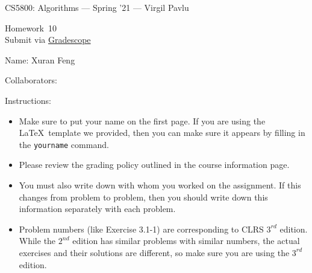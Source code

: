 \documentclass[11pt]{article}
\newcommand{\yourcollaborators}{}
\theoremstyle{definition}
\newcommand{\instructor}{Virgil Pavlu}
\newcommand{\hwnum}{10}
\theoremstyle{theorem}
\begin{document}
{\Large 
\begin{center}{CS5800: Algorithms} --- Spring '21 --- \instructor \end{center}}
{\large
\vspace{10pt}
\noindent Homework~\hwnum \vspace{2pt}\\
Submit via \href{https://www.gradescope.com/courses/232127}{Gradescope}}

\bigskip
{\large \noindent Name: Xuran Feng }

{\large \noindent Collaborators: \yourcollaborators}

\vspace{15pt}

{\large \noindent Instructions:}

\begin{itemize}

\item Make sure to put your name on the first page.  If you are using the \LaTeX~template we provided, then you can make sure it appears by filling in the \texttt{yourname} command.

\item Please review the grading policy outlined in the course information page.

\item You must also write down with whom you worked on the assignment.  If this changes from problem to problem, then you should write down this information separately with each problem.

\item Problem numbers (like Exercise 3.1-1) are corresponding to CLRS $3^{rd}$ edition.  While the  $2^{nd}$ edition  has  similar  problems  with  similar  numbers,  the  actual  exercises  and their solutions are different, so make sure you are using the $3^{rd}$ edition.

\end{itemize}

\newpage
\end{document}
